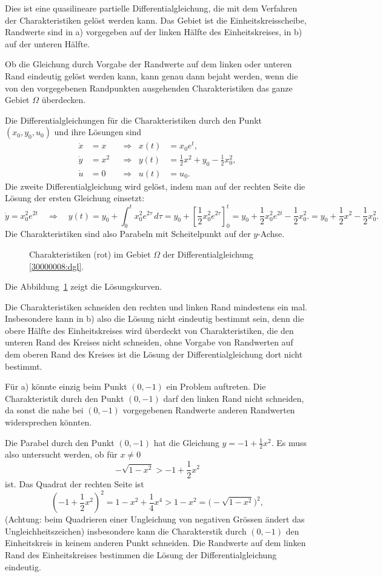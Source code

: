 \begin{loesung}
Dies ist eine quasilineare partielle Differentialgleichung, die mit dem
Verfahren der Charakteristiken gelöst werden kann.
Das Gebiet ist die Einheitskreisscheibe, Randwerte sind in a) vorgegeben
auf der linken Hälfte des Einheitskreises, in b) auf der unteren Hälfte.

Ob die Gleichung durch Vorgabe der Randwerte auf dem linken oder unteren Rand
eindeutig gelöst werden kann, kann genau dann bejaht werden, wenn die 
von den vorgegebenen Randpunkten
ausgehenden Charakteristiken das ganze Gebiet $\Omega$ überdecken.

Die Differentialgleichungen für die Charakteristiken durch den Punkt
$(x_0,y_0,u_0)$ und ihre Lösungen sind
\begin{align*}
\dot x&=x&&\Rightarrow&x(t)&=x_0e^t,\\
\dot y&=x^2&&\Rightarrow&y(t)&=\frac12x^2+y_0-\frac12x_0^2,\\
\dot u&=0&&\Rightarrow&u(t)&=u_0.
\end{align*}
Die zweite Differentialgleichung wird gelöst, indem man auf der rechten
Seite die Lösung der ersten Gleichung einsetzt:
\[
\dot y=x_0^2e^{2t}
\quad\Rightarrow\quad
y(t)
=y_0 + \int_0^tx_0^2e^{2\tau}\,d\tau
=y_0 + \left[\frac12x_0^2e^{2\tau}\right]_0^t
=y_0 + \frac12x_0^2e^{2t}-\frac12x_0^2.
=y_0 + \frac12x^2-\frac12x_0^2.
\]
Die Charakteristiken sind also Parabeln mit Scheitelpunkt auf der
$y$-Achse.
\begin{figure}
\begin{center}
\end{center}
\caption{Charakteristiken (rot) im Gebiet $\Omega$ der Differentialgleichung
\eqref{30000008:dgl}.\label{30000008:domain}}
\end{figure}
Die Abbildung~\ref{30000008:domain} zeigt die Lösungskurven.

Die Charakteristiken schneiden den rechten und linken Rand mindestens ein mal.
Insbesondere kann in b) also die Lösung nicht eindeutig bestimmt sein, denn
die obere Hälfte des Einheitskreises wird überdeckt von
Charakteristiken, die den unteren Rand des Kreises nicht schneiden,
ohne Vorgabe von Randwerten auf dem oberen Rand des Kreises ist die
Lösung der Differentialgleichung dort nicht bestimmt.

Für a) könnte einzig beim Punkt $(0,-1)$ ein Problem auftreten.
Die Charakteristik durch den
Punkt $(0,-1)$ darf den linken Rand nicht schneiden, da sonst die 
nahe bei $(0,-1)$ vorgegebenen Randwerte anderen Randwerten widersprechen
könnten.

Die Parabel durch den Punkt $(0,-1)$ hat die Gleichung $y=-1+\frac12x^2$.
Es muss also untersucht werden, ob für $x\ne 0$
\[
-\sqrt{1-x^2} > -1+\frac12x^2
\]
ist. Das Quadrat der rechten Seite ist
\[
(-1+\frac12x^2)^2=1-x^2 +\frac14x^4 > 1-x^2=\bigl(-\sqrt{1-x^2}\bigr)^2,
\]
(Achtung: beim Quadrieren einer Ungleichung von negativen Grössen ändert das
Ungleichheitszeichen)
insbesondere kann die Charakterstik durch $(0,-1)$ den Einheitskreis
in keinem anderen Punkt schneiden.
Die Randwerte auf dem linken Rand des Einheitskreises
bestimmen die Lösung der Differentialgleichung eindeutig.
\end{loesung}


